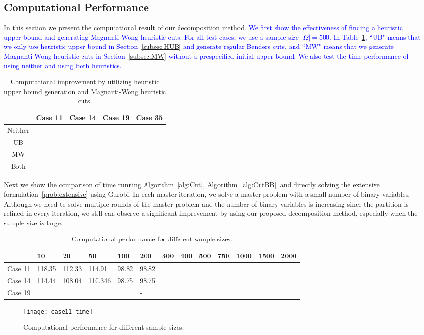 \documentclass[11pt]{article}
\newcommand{\noi}{\noindent}
\newcommand{\tcb}{\textcolor{blue}}
\begin{document}
	\subsection{Computational Performance} \label{subsec:time}
	In this section we present the computational result of our decomposition method. \tcb{We first show the effectiveness of finding a heuristic upper bound and generating Magnanti-Wong heuristic cuts. For all test cases, we use a sample size \(|\Omega| = 500\). In Table~\ref{table:heuristics}, ``UB" means that we only use heuristic upper bound in Section~\ref{subsec:HUB} and generate regular Benders cuts, and ``MW" means that we generate Magnanti-Wong heuristic cuts in Section~\ref{subsec:MW} without a prespecified initial upper bound. We also test the time performance of using neither and using both heuristics.}
	\begin{table}[H]
		\centering		
		\begin{tabular}{ c | l l l l }
			\hline
			& Case 11 & Case 14 & Case 19 & Case 35 \\ \hline
			Neither & & & &  \\
			UB & & & & \\
			MW & & & & \\
			Both & & & & \\
			\hline
		\end{tabular}
		\caption{Computational improvement by utilizing heuristic upper bound generation and Magnanti-Wong heuristic cuts.}
		\label{table:heuristics}
	\end{table}
	\noi Next we show the comparison of time running Algorithm~\ref{alg:Cut}, Algorithm~\ref{alg:CutBB}, and directly solving the extensive formulation~\eqref{prob:extensive} using Gurobi. In each master iteration, we solve a master problem with a small number of binary variables. Although we need to solve multiple rounds of the master problem and the number of binary variables is increasing since the partition is refined in every iteration, we still can observe a significant improvement by using our proposed decomposition method, especially when the sample size is large.
	\begin{table}[H]
		\centering		
		\begin{tabular}{ c | l l l l l l l l l l l l }
			\hline
			&10 & 20 & 50 & 100 & 200 & 300 & 400 & 500 & 750 & 1000 & 1500 & 2000 \\ \hline
			Case 11& 118.35 & 112.33 & 114.91 & 98.82 & 98.82 \\
			Case 14 & 114.44 & 108.04 & 110.346 & 98.75 & 98.75 \\
			Case 19 & & & &  & -\\
			\hline
		\end{tabular}
		\caption{Computational performance for different sample sizes.}
		\label{table:time}
	\end{table}
	\begin{figure}[H]
		\centering
		\texttt{[image: case11\_time]}
		\caption{Computational performance for different sample sizes.}
		\label{fig:time}
	\end{figure}
\end{document}

